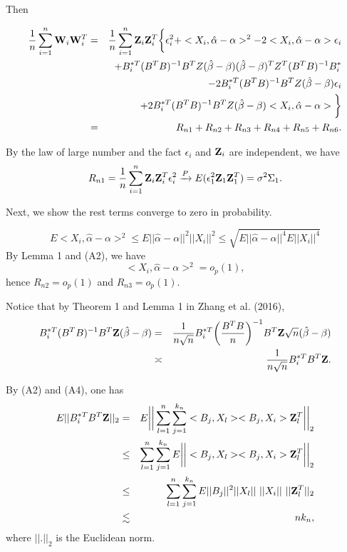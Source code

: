 \documentclass[preprint,12pt]{elsarticle}
\begin{document}
	Then 
	
	\begin{eqnarray*}
		\frac{1}{n}\sum_{i=1}^n{\bf W}_i{\bf W}_i^T&=&\frac{1}{n}\sum_{i=1}^n{\bf Z}_i{\bf Z}_i^T\bigg\{\epsilon_i^2+<X_i,\hat{\alpha}-\alpha>^2-2<X_i,\hat{\alpha}-\alpha>\epsilon_i\\
		& &+B_i^{*T}(B^TB)^{-1}B^TZ(\hat{\beta}-\beta)(\hat{\beta}-\beta)^TZ^T(B^TB)^{-1}B_i^{*}\\
		& &-2 B_i^{*T}(B^TB)^{-1}B^TZ(\hat{\beta}-\beta)\epsilon_i\\
		& &+2 B_i^{*T}(B^TB)^{-1}B^TZ(\hat{\beta}-\beta)<X_i,\hat{\alpha}-\alpha>\bigg\}\\
		&=&R_{n1}+R_{n2}+R_{n3}+R_{n4}+R_{n5}+R_{n6}.
	\end{eqnarray*}

	By the law of large number and the fact $\epsilon_i$ and ${\bf Z}_i$ are independent, we have
	\[R_{n1}=\frac{1}{n}\sum_{i=1}^n{\bf Z}_i{\bf Z}_i^T\epsilon_i^2\xrightarrow{P}E(\epsilon_1^2{\bf Z}_1{\bf Z}_1^T)= \sigma^2\Sigma_1.\]

	Next, we show the rest terms converge to zero in probability.
	
	\[E<X_i,\hat{\alpha}-\alpha>^2\leq E||\hat{\alpha}-\alpha||^2||X_i||^2\leq\sqrt{E||\hat{\alpha}-\alpha||^4E||X_i||^4}\]
	By Lemma 1 and (A2), we have
	\[<X_i,\hat{\alpha}-\alpha>^2=o_p(1),\]
	hence $R_{n2}=o_p(1)$ and $R_{n3}=o_p(1)$.


	Notice that by Theorem 1 and Lemma 1 in Zhang et al. (2016),
	\begin{eqnarray*}
	B_i^{*T}(B^TB)^{-1}B^T{\bf Z}(\hat{\beta}-\beta)&=&\frac{1}{n\sqrt{n}}B_i^{*T}\bigg(\frac{B^TB}{n}\bigg)^{-1}B^T{\bf Z}\sqrt{n}(\hat{\beta}-\beta)\\
	&\asymp&\frac{1}{n\sqrt{n}}B_i^{*T}B^T{\bf Z}.
	\end{eqnarray*}


	By (A2) and (A4), one has
	\begin{eqnarray*}
	E||B_i^{*T}B^T{\bf Z}||_2&=&E\bigg|\bigg|\sum_{l=1}^n\sum_{j=1}^{k_n}<B_j, X_l><B_j,X_i>{\bf Z}_l^T\bigg|\bigg|_2\\
	&\leq&\sum_{l=1}^n\sum_{j=1}^{k_n}E\bigg|\bigg|<B_j, X_l><B_j,X_i>{\bf Z}_l^T\bigg|\bigg|_2\\
	&\leq&\sum_{l=1}^n\sum_{j=1}^{k_n}E||B_j||^2||X_l||\ ||X_i||\ ||{\bf Z}_l^T||_2\\
	&\lesssim&nk_n,
	\end{eqnarray*}
	 where $||.||_2$ is the Euclidean norm.
\end{document}
